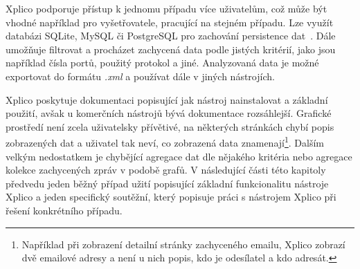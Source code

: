         Xplico podporuje přístup k jednomu případu více uživatelům, což může být vhodné například pro vyšetřovatele, pracující na stejném případu. Lze využít databázi SQLite, MySQL či PostgreSQL pro zachování persistence dat~\cite{XplicoReference}. Dále umožňuje filtrovat a procházet zachycená data podle jistých kritérií, jako jsou například čísla portů, použitý protokol a jiné. Analyzovaná data je možné exportovat do formátu \textit{.xml} a používat dále v jiných nástrojích.

        Xplico poskytuje dokumentaci popisující jak nástroj nainstalovat a základní použití, avšak u komerčních nástrojů bývá dokumentace rozsáhlejší. Grafické prostředí není zcela uživatelsky přívětivé, na některých stránkách chybí popis zobrazených dat a uživatel tak neví, co zobrazená data znamenají\footnote{Například při zobrazení detailní stránky zachyceného emailu, Xplico zobrazí dvě emailové adresy a není u nich popis, kdo je odesílatel a kdo adresát.}. Dalším velkým nedostatkem je chybějící agregace dat dle nějakého kritéria nebo agregace kolekce zachycených zpráv v podobě grafů. V následující části této kapitoly předvedu jeden běžný případ užití popisující základní funkcionalitu nástroje Xplico a jeden specifický soutěžní, který popisuje práci s nástrojem Xplico při řešení konkrétního případu.
        
